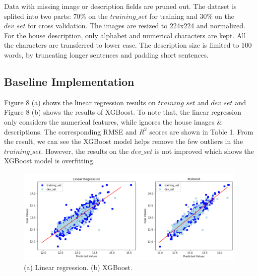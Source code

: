 \documentclass{article} %
\begin{document}
Data with missing image or description fields are pruned out.
The dataset is splited into two parts: 70\% on the $training\_set$ for training
and 30\% on the $dev\_set$ for cross validation.
The images are resized to 224x224 and normalized.
For the house description, only alphabet and numerical characters are kept.
All the characters are transferred to lower case.
The description size is limited to 100 words, 
by truncating longer sentences and padding short sentences.

\subsection{Baseline Implementation}

Figure 8 (a) shows the linear regression results \cite{lr} on $training\_set$ and $dev\_set$
and Figure 8 (b) shows the results of XGBoost\cite{xgboost}.
To note that, the linear regression only considers the numerical features,
while ignores the house images \& descriptions.
The corresponding RMSE and $R^2$ scores are shown in Table 1.
From the result, we can see the XGBoost model helps remove the few outliers in the $training\_set$.
However, the results on the $dev\_set$ is not improved which shows the XGBoost model is overfitting.

\begin{figure}[h]
	\begin{center}
		\includegraphics[width=0.9\linewidth]{fig/exp.png}
	\end{center}
	\caption{(a) Linear regression. (b) XGBoost.}
	\label{fig:long}
	\label{fig:onecol}
\end{figure}
\end{document}

